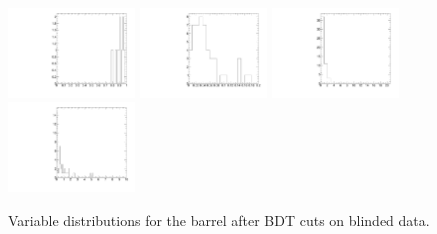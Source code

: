 \begin{figure}
  \includegraphics[width=0.3\textwidth]{Figures/AfterBDTCut_iso_Barrel.pdf}
  \includegraphics[width=0.3\textwidth]{Figures/AfterBDTCut_docatrk_Barrel.pdf}
  \includegraphics[width=0.3\textwidth]{Figures/AfterBDTCut_closetrk_Barrel.pdf}
  \includegraphics[width=0.3\textwidth]{Figures/AfterBDTCut_chi2dof_Barrel.pdf}
  \caption{Variable distributions for the barrel after BDT cuts on blinded data.}
  \label{fig:AfterBDTCutVariablesBarrelBlinded}
\end{figure}

